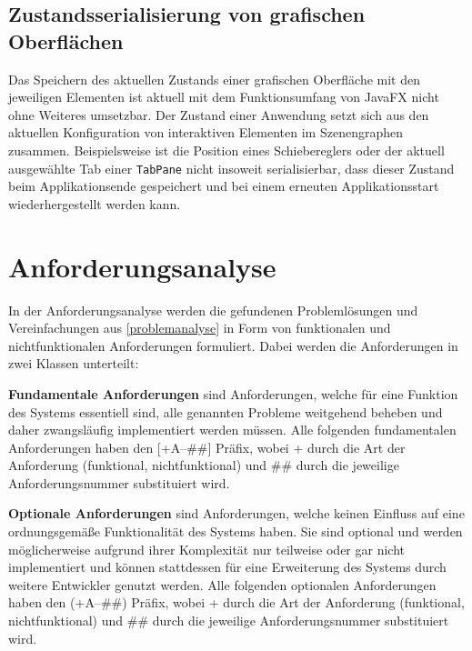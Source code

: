 \subsection{Zustandsserialisierung von grafischen Oberflächen}
Das Speichern des aktuellen Zustands einer grafischen Oberfläche mit den jeweiligen Elementen ist aktuell mit dem Funktionsumfang von JavaFX nicht ohne Weiteres umsetzbar. Der Zustand einer Anwendung setzt sich aus den aktuellen Konfiguration von interaktiven Elementen im Szenengraphen zusammen. Beispielsweise ist die Position eines Schiebereglers oder der aktuell ausgewählte Tab einer \texttt{TabPane} nicht insoweit serialisierbar, dass dieser Zustand beim Applikationsende gespeichert und bei einem erneuten Applikationsstart wiederhergestellt werden kann.
\section{Anforderungsanalyse}
\label{anforderungsanalyse}
In der Anforderungsanalyse werden die gefundenen Problemlösungen und Vereinfachungen aus \autoref{problemanalyse} in Form von funktionalen und nichtfunktionalen Anforderungen formuliert. Dabei werden die Anforderungen in zwei Klassen unterteilt:
\begin{description}
	\item \textbf{Fundamentale Anforderungen} sind Anforderungen, welche für eine Funktion des Systems essentiell sind, alle genannten Probleme weitgehend beheben und daher zwangsläufig implementiert werden müssen. Alle folgenden fundamentalen Anforderungen haben den [+A--\#\#] Präfix, wobei + durch die Art der Anforderung (funktional, nichtfunktional) und \#\# durch die jeweilige Anforderungsnummer substituiert wird.
	\item \textbf{Optionale Anforderungen} sind Anforderungen, welche keinen Einfluss auf eine ordnungsgemäße Funktionalität des Systems haben. Sie sind optional und werden möglicherweise aufgrund ihrer Komplexität nur teilweise oder gar nicht implementiert und können stattdessen für eine Erweiterung des Systems durch weitere Entwickler genutzt werden. Alle folgenden optionalen Anforderungen haben den (+A--\#\#) Präfix, wobei + durch die Art der Anforderung (funktional, nichtfunktional) und \#\# durch die jeweilige Anforderungsnummer substituiert wird.
\end{description}


